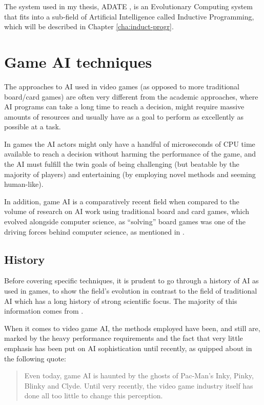\documentclass[]{report}
\begin{document}
The system used in my thesis, ADATE \citep{olsson1995inductive}, is an
Evolutionary Computing system that fits into a sub-field of Artificial
Intelligence called Inductive Programming, which will be described in Chapter
\ref{cha:induct-progr}.

\section{Game AI techniques}
\label{sec:game-ai-techniques}

The approaches to AI used in video games (as opposed to more traditional
board/card games) are often very different from the academic approaches, where
AI programs can take a long time to reach a decision, might require massive
amounts of resources and usually have as a goal to perform as excellently as
possible at a task.

In games the AI actors might only have a handful of microseconds of CPU time
available to reach a decision without harming the performance of the game, and
the AI must fulfill the twin goals of being challenging (but beatable by the
majority of players) and entertaining (by employing novel methods and seeming
human-like).

In addition, game AI is a comparatively recent field when compared to the volume
of research on AI work using traditional board and card games, which evolved
alongside computer science, as ``solving'' board games was one of the driving
forces behind computer science, as mentioned in \citet{schaeffer2002games}.

\subsection{History}
\label{sec:game-ai-history}

Before covering specific techniques, it is prudent to go through a history of AI
as used in games, to show the field's evolution in contrast to the field of
traditional AI which has a long history of strong scientific focus. The majority
of this information comes from \citet{tozour2002evolution}.

When it comes to video game AI, the methods employed have been, and still are,
marked by the heavy performance requirements and the fact that very little
emphasis has been put on AI sophistication until recently, as quipped about in
the following quote:

\begin{quote}
  Even today, game AI is haunted by the ghosts of Pac-Man's Inky, Pinky, Blinky
  and Clyde. Until very recently, the video game industry itself has done all
  too little to change this perception.
\end{quote}
\end{document}
